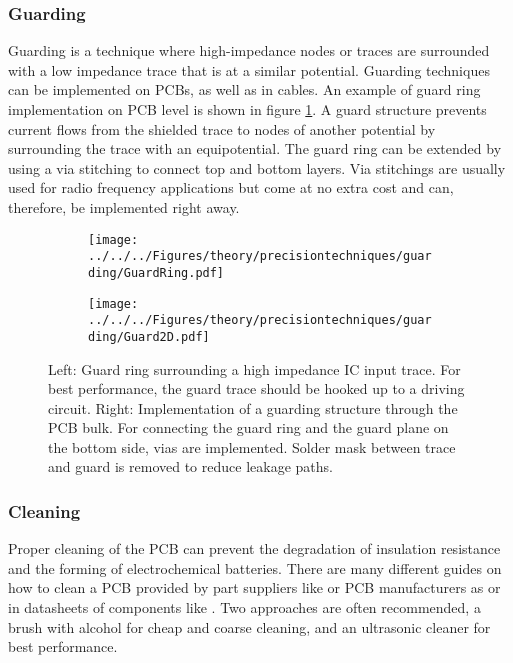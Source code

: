 \subsubsection*{Guarding}
\label{sec:theory:guarding}
Guarding is a technique where high-impedance nodes or traces are surrounded with a low impedance trace that is at a similar potential. Guarding techniques can be implemented on \acp{PCB}, as well as in cables.
An example of guard ring implementation on PCB level is shown in figure \ref{fig:theory:Guarding}. A guard structure prevents current flows from the shielded trace to nodes of another potential by surrounding the trace with an equipotential. The guard ring can be extended by using a via stitching to connect top and bottom layers. Via stitchings are usually used for radio frequency applications but come at no extra cost and can, therefore, be implemented right away.
\begin{figure}
	\begin{subfigure}[b]{0.49\textwidth}
		\centering
		\texttt{[image: ../../../Figures/theory/precisiontechniques/guarding/GuardRing.pdf]}
	\end{subfigure}\hfill
	\begin{subfigure}[b]{0.49\textwidth}
		\centering
		\texttt{[image: ../../../Figures/theory/precisiontechniques/guarding/Guard2D.pdf]}
	\end{subfigure}
	\caption{Left: Guard ring surrounding a high impedance IC input trace. For best performance, the guard trace should be hooked up to a driving circuit. Right: Implementation of a guarding structure through the PCB bulk. For connecting the guard ring and the guard plane on the bottom side, vias are implemented. Solder mask between trace and guard is removed to reduce leakage paths.}
	\label{fig:theory:Guarding}
\end{figure}
\subsubsection{Cleaning}
Proper cleaning of the PCB can prevent the degradation of insulation resistance and the forming of electrochemical batteries. There are many different guides on how to clean a PCB provided by part suppliers like \cite{digikeyCleaning} or PCB manufacturers as \cite{wellpcbCleaning} or in datasheets of components like \cite{ADA4530}. Two approaches are often recommended, a brush with alcohol for cheap and coarse cleaning, and an ultrasonic cleaner for best performance.

